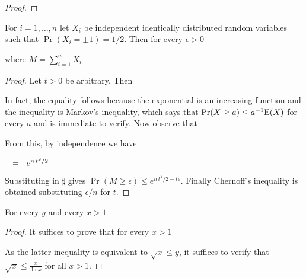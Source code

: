 \documentclass[sputnik.tex]{subfiles}
\begin{document}
\begin{proof}
\end{proof}

\begin{lemma}\label{Chernoff}
For $i=1,\dots,n$ let $X_i$ be independent identically distributed random variables such that\/ $\Pr(X_i=\pm1)=1/2$.
Then for every $\epsilon>0$

\hfill where $\displaystyle M=\sum^n_{i=1}X_i$
\end{lemma}
\begin{proof}
Let $t>0$ be arbitrary.
Then



In fact, the equality follows because the exponential is an increasing function and the inequality is Markov's inequality, which says that $\Pr(X\ge a)\le a^{-1}{\rm E}(X)$ for every $a$ and is immediate to verify.
Now observe that






From this, by independence we have 

$\medrel{=}e^{n\,t^2/2}$

Substituting in $\sharp$ gives $\Pr(M\ge\epsilon)\le e^{n\,t^2/2-t\epsilon}$.
Finally Chernoff's inequality is obtained substituting $\epsilon/n$ for $t$.
\end{proof}

\begin{proposition}\label{prop_disequazione}
For every $y$ and every $x>1$

\end{proposition}
\begin{proof}
It suffices to prove that for  every $x>1$


As the latter inequality is equivalent to $\sqrt{x}\le y$, it suffices to verify that $\sqrt{x}\le\displaystyle\frac{x}{\ln x}$ for all $x>1$.
\end{proof}
\end{document}
